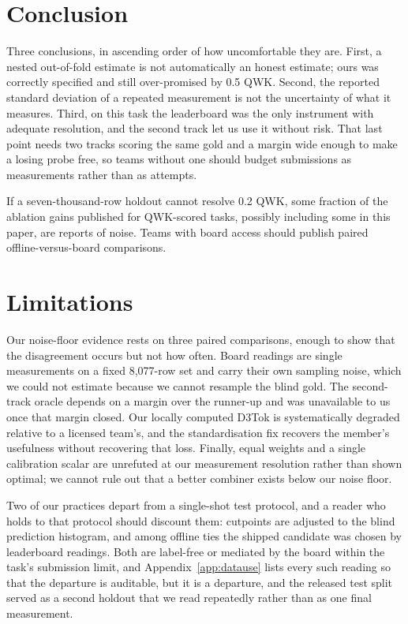 \documentclass[11pt]{article}
\begin{document}
\section{Conclusion}

Three conclusions, in ascending order of how uncomfortable they are. First, a nested
out-of-fold estimate is not automatically an honest estimate; ours was correctly specified and
still over-promised by 0.5 QWK. Second, the reported standard deviation of a repeated
measurement is not the uncertainty of what it measures. Third, on this task the leaderboard was
the only instrument with adequate resolution, and the second track let us use it without risk.
That last point needs two tracks scoring the same gold and a margin wide enough to make a
losing probe free, so teams without one should budget submissions as measurements rather than
as attempts.

If a seven-thousand-row holdout cannot resolve 0.2 QWK, some fraction of the ablation gains published for QWK-scored
tasks, possibly including some in this paper, are reports of noise. Teams with board access
should publish paired offline-versus-board comparisons.

\section*{Limitations}

Our noise-floor evidence rests on three paired comparisons, enough to show that the disagreement
occurs but not how often. Board readings are single measurements on a fixed 8,077-row set
and carry their own sampling noise, which we could not estimate because we cannot resample
the blind gold. The second-track oracle depends on a margin over the runner-up and was
unavailable to us once that margin closed. Our locally computed D3Tok is systematically
degraded relative to a licensed team's, and the standardisation fix recovers the member's
usefulness without recovering that loss. Finally, equal weights and a single calibration
scalar are unrefuted at our measurement resolution rather than shown optimal; we cannot rule
out that a better combiner exists below our noise floor.

Two of our practices depart from a single-shot test protocol, and a reader who holds to that
protocol should discount them: cutpoints are adjusted to the blind prediction histogram, and
among offline ties the shipped candidate was chosen by leaderboard readings. Both are
label-free or mediated by the board within the task's submission limit, and
Appendix~\ref{app:datause} lists every such reading so that the departure is auditable, but
it is a departure, and the released test split served as a second holdout that we read
repeatedly rather than as one final measurement.
\end{document}
